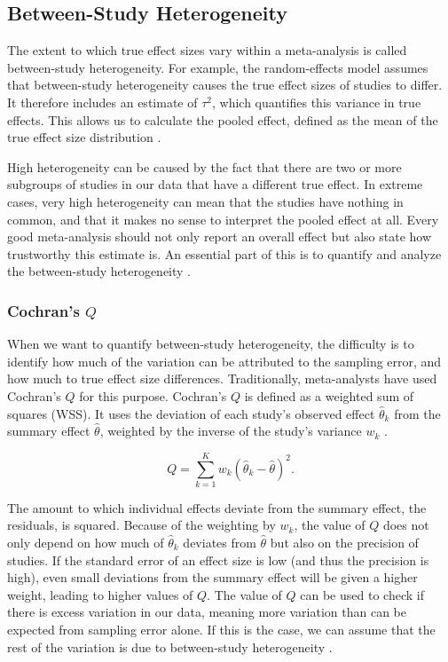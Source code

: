\documentclass[../../../main.tex]{subfiles}
\begin{document}
\subsection{Between-Study Heterogeneity}

The extent to which true effect sizes vary within a meta-analysis is called between-study heterogeneity. For example, the random-effects model assumes that between-study heterogeneity causes the true effect sizes of studies to differ. It therefore includes an estimate of $\tau^2$, which quantifies this variance in true effects. This allows us to calculate the pooled effect, defined as the mean of the true effect size distribution \autocite{Harrer2021}.

High heterogeneity can be caused by the fact that there are two or more subgroups of studies in our data that have a different true effect. In extreme cases, very high heterogeneity can mean that the studies have nothing in common, and that it makes no sense to interpret the pooled effect at all. Every good meta-analysis should not only report an overall effect but also state how trustworthy this estimate is. An essential part of this is to quantify and analyze the between-study heterogeneity \autocite{Harrer2021}.

\subsubsection{Cochran's $Q$}

When we want to quantify between-study heterogeneity, the difficulty is to identify how much of the variation can be attributed to the sampling error, and how much to true effect size differences. Traditionally, meta-analysts have used Cochran's $Q$ for this purpose. Cochran's $Q$ is defined as a weighted sum of squares (WSS). It uses the deviation of each study's observed effect $\hat{\theta}_k$ from the summary effect $\hat{\theta}$, weighted by the inverse of the study's variance $w_k$ \autocite{Harrer2021}.

\begin{equation}
Q = \sum_{k=1}^{K}w_k(\hat{\theta}_k-\hat{\theta})^2.
\end{equation}

The amount to which individual effects deviate from the summary effect, the residuals, is squared. Because of the weighting by $w_k$, the value of $Q$ does not only depend on how much of $\hat{\theta}_k$ deviates from $\hat{\theta}$ but also on the precision of studies. If the standard error of an effect size is low (and thus the precision is high), even small deviations from the summary effect will be given a higher weight, leading to higher values of $Q$. The value of $Q$ can be used to check if there is excess variation in our data, meaning more variation than can be expected from sampling error alone. If this is the case, we can assume that the rest of the variation is due to between-study heterogeneity \autocite{Harrer2021}.
\end{document}
